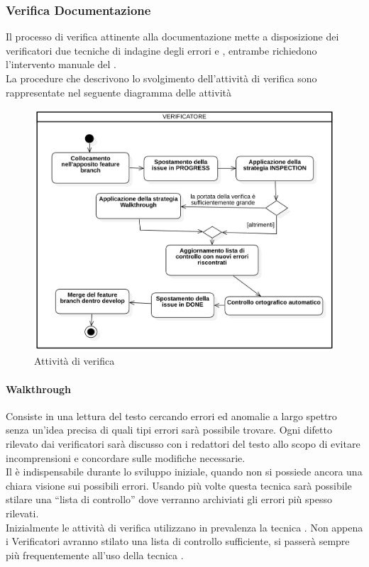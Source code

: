         \subsubsection{Verifica Documentazione}
            Il processo di verifica attinente alla documentazione mette a disposizione dei verificatori due tecniche di indagine degli errori  e , entrambe richiedono l’intervento manuale del . \\
            La procedure che descrivono lo svolgimento dell’attività di verifica sono rappresentate nel seguente diagramma delle attività \\
            \begin{figure}[H]
                    \centering
                    \includegraphics[width=1.0\textwidth]{res/images/attivita_di_verifica.png}
                \caption{Attività di verifica}
                \label{Attività di verifica}
            \end{figure}
            \paragraph{Walkthrough}
                Consiste in una lettura del testo cercando errori ed anomalie a largo spettro senza un’idea precisa di quali tipi errori sarà possibile trovare. Ogni difetto rilevato dai verificatori sarà discusso con i redattori del testo allo scopo di evitare incomprensioni e concordare sulle modifiche necessarie.\\
                Il  è indispensabile durante lo sviluppo iniziale, quando non si possiede ancora una chiara visione sui possibili errori. Usando più volte questa tecnica sarà possibile stilare una “lista di controllo” dove verranno archiviati gli errori più spesso rilevati. \\
                Inizialmente le attività di verifica utilizzano in prevalenza la tecnica . Non appena i Verificatori avranno stilato una lista di controllo sufficiente, si passerà sempre più frequentemente all’uso della tecnica .\\

